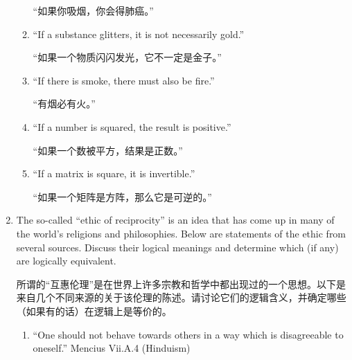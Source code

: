 \begin{enumerate}
\begin{enumerate}
  “如果你吸烟，你会得肺癌。”
  \item ``If a substance glitters, it is not necessarily gold.''
  
  “如果一个物质闪闪发光，它不一定是金子。”
  \item ``If there is smoke, there must also be fire.''
  
  “有烟必有火。”
  \item ``If a number is squared, the result is positive.''
  
  “如果一个数被平方，结果是正数。”
  \item ``If a matrix is square, it is invertible.''
  
  “如果一个矩阵是方阵，那么它是可逆的。”
  \end{enumerate}
  
  \wbvfill
  
  
  \hintspagebreak
  \workbookpagebreak
  
  \item The so-called ``ethic of reciprocity'' is an idea that has come 
  up in many of the 
  world's religions and philosophies.  
  Below are statements of the ethic
  from several sources.
  Discuss their logical meanings and determine which (if 
  any) are logically equivalent.
  
  所谓的“互惠伦理”是在世界上许多宗教和哲学中都出现过的一个思想。以下是来自几个不同来源的关于该伦理的陈述。请讨论它们的逻辑含义，并确定哪些（如果有的话）在逻辑上是等价的。
  \begin{enumerate}
  \item ``One should not behave towards others in a way which is disagreeable to oneself.'' Mencius Vii.A.4 (Hinduism)
  

\end{enumerate}
\end{enumerate}
